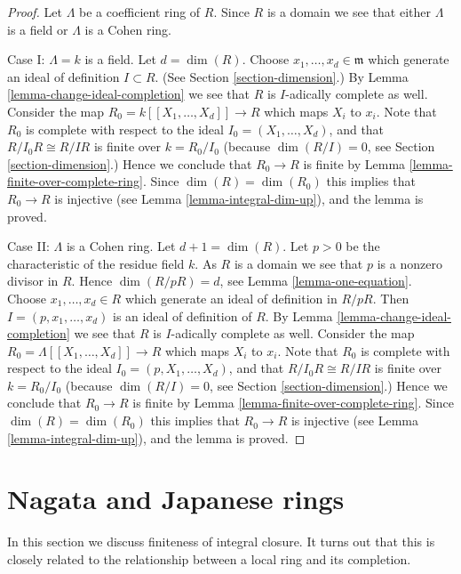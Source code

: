 \begin{proof}
Let $\Lambda$ be a coefficient ring of $R$.
Since $R$ is a domain we see that either $\Lambda$ is a field
or $\Lambda$ is a Cohen ring.

\medskip\noindent
Case I: $\Lambda = k$ is a field. Let $d = \dim(R)$.
Choose $x_1, \ldots, x_d \in \mathfrak m$
which generate an ideal of definition $I \subset R$.
(See Section \ref{section-dimension}.)
By Lemma \ref{lemma-change-ideal-completion} we see that $R$
is $I$-adically complete as well.
Consider the map $R_0 = k[[X_1, \ldots, X_d]] \to R$
which maps $X_i$ to $x_i$.
Note that $R_0$ is complete with respect to the ideal
$I_0 = (X_1, \ldots, X_d)$,
and that $R/I_0R \cong R/IR$ is finite over $k = R_0/I_0$
(because $\dim(R/I) = 0$, see Section \ref{section-dimension}.)
Hence we conclude that $R_0 \to R$ is finite by
Lemma \ref{lemma-finite-over-complete-ring}.
Since $\dim(R) = \dim(R_0)$ this implies that
$R_0 \to R$ is injective (see Lemma \ref{lemma-integral-dim-up}),
and the lemma is proved.

\medskip\noindent
Case II: $\Lambda$ is a Cohen ring. Let $d + 1 = \dim(R)$.
Let $p > 0$ be the characteristic of the residue field $k$.
As $R$ is a domain we see that $p$ is a nonzero divisor in $R$.
Hence $\dim(R/pR) = d$, see Lemma \ref{lemma-one-equation}.
Choose $x_1, \ldots, x_d \in R$
which generate an ideal of definition in $R/pR$.
Then $I = (p, x_1, \ldots, x_d)$ is an ideal of definition of $R$.
By Lemma \ref{lemma-change-ideal-completion} we see that $R$
is $I$-adically complete as well.
Consider the map $R_0 = \Lambda[[X_1, \ldots, X_d]] \to R$
which maps $X_i$ to $x_i$.
Note that $R_0$ is complete with respect to the ideal
$I_0 = (p, X_1, \ldots, X_d)$,
and that $R/I_0R \cong R/IR$ is finite over $k = R_0/I_0$
(because $\dim(R/I) = 0$, see Section \ref{section-dimension}.)
Hence we conclude that $R_0 \to R$ is finite by
Lemma \ref{lemma-finite-over-complete-ring}.
Since $\dim(R) = \dim(R_0)$ this implies that
$R_0 \to R$ is injective (see Lemma \ref{lemma-integral-dim-up}),
and the lemma is proved.
\end{proof}





\section{Nagata and Japanese rings}
\label{section-nagata}

\noindent
In this section we discuss finiteness of integral closure.
It turns out that this is closely related to the relationship
between a local ring and its completion.

